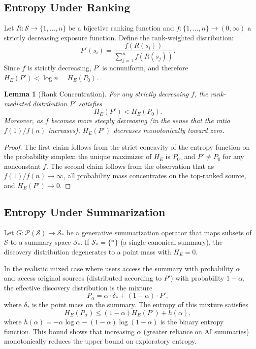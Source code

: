 \documentclass[12pt,a4paper]{article}
\theoremstyle{definition}
\theoremstyle{plain}
\newtheorem{lemma}[definition]{Lemma}
\theoremstyle{remark}
\newcommand{\HE}{H_{E}}
\newcommand{\calS}{\mathcal{S}}
\begin{document}
\subsection{Entropy Under Ranking}

Let $R : \calS \to \{1, \ldots, n\}$ be a bijective ranking function and $f : \{1,\ldots,n\}
\to (0, \infty)$ a strictly decreasing exposure function. Define the rank-weighted distribution:
\[
P'(s_i) = \frac{f(R(s_i))}{\sum_{j=1}^n f(R(s_j))}.
\]
Since $f$ is strictly decreasing, $P'$ is nonuniform, and therefore $\HE(P') < \log n =
\HE(P_0)$.

\begin{lemma}[Rank Concentration]
For any strictly decreasing $f$, the rank-mediated distribution $P'$ satisfies
\[
\HE(P') < \HE(P_0).
\]
Moreover, as $f$ becomes more steeply decreasing (in the sense that the ratio $f(1)/f(n)$
increases), $\HE(P')$ decreases monotonically toward zero.
\end{lemma}

\begin{proof}
The first claim follows from the strict concavity of the entropy function on the probability
simplex: the unique maximizer of $\HE$ is $P_0$, and $P' \neq P_0$ for any nonconstant $f$.
The second claim follows from the observation that as $f(1)/f(n) \to \infty$, all probability
mass concentrates on the top-ranked source, and $\HE(P') \to 0$.
\end{proof}

\subsection{Entropy Under Summarization}

Let $G : \mathcal{P}(\calS) \to \calS_*$ be a generative summarization operator that maps
subsets of $\calS$ to a summary space $\calS_*$. If $\calS_* = \{*\}$ (a single canonical
summary), the discovery distribution degenerates to a point mass with $\HE = 0$.

In the realistic mixed case where users access the summary with probability $\alpha$ and
access original sources (distributed according to $P'$) with probability $1 - \alpha$, the
effective discovery distribution is the mixture
\[
P_\alpha = \alpha \cdot \delta_* + (1 - \alpha) \cdot P',
\]
where $\delta_*$ is the point mass on the summary. The entropy of this mixture satisfies
\[
\HE(P_\alpha) \leq (1 - \alpha)\HE(P') + h(\alpha),
\]
where $h(\alpha) = -\alpha \log \alpha - (1-\alpha)\log(1-\alpha)$ is the binary entropy
function. This bound shows that increasing $\alpha$ (greater reliance on AI summaries)
monotonically reduces the upper bound on exploratory entropy.
\end{document}
